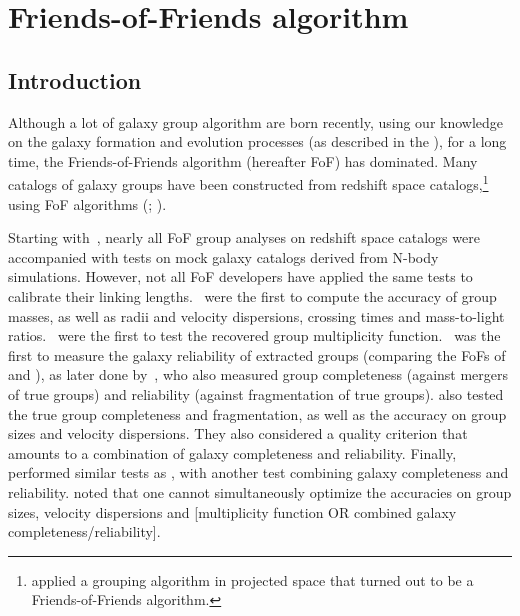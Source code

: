 \def\bpar{$b_\parallel$}
\def\bperp{$b_\bot$}

\chapter{Friends-of-Friends algorithm}
\label{cha:friends_of_friends_algorithm}
\minitoc%

\section{Introduction}
\label{sec:fof_introduction}

Although a lot of galaxy group algorithm are born recently, using our knowledge
on the galaxy formation and evolution processes (as described in the
), for a long time, the
Friends-of-Friends algorithm (hereafter FoF) has dominated. Many catalogs of
galaxy groups have been constructed from redshift space
catalogs,\footnote{\cite{TG76} applied a grouping algorithm in projected space
that turned out to be a Friends-of-Friends algorithm.} using FoF algorithms
(\citealp*{HG82,NW87,RGH89,TrasartiBattistoni98,MZ02};
\citealp{Eke+04,Berlind+06,Tago+10,Robotham+11,Tempel+14}).

Starting with~\cite{NW87},  nearly all FoF group analyses on redshift space
catalogs were accompanied with tests on mock galaxy catalogs derived from
N-body simulations. However, not all FoF developers have applied the same tests
to calibrate their linking lengths.~\cite{NW87} were the first to compute the
accuracy of group masses, as well as radii and velocity dispersions, crossing
times and mass-to-light ratios.~\cite{RGH89} were the first to test the
recovered group multiplicity function.~\cite{Frederic95a} was the first to
measure the galaxy reliability of extracted groups (comparing the FoFs of
\citealp{HG82} and \citealp{NW87}), as later done by~\cite{MZ02}, who also
measured group completeness (against mergers of true groups) and reliability
(against fragmentation of true groups). \citet{Eke+04} also tested the true
group completeness and fragmentation, as well as the accuracy on group sizes
and velocity dispersions. They also considered a quality criterion that amounts
to a combination of galaxy completeness and reliability. Finally,
\citet{Berlind+06} performed similar tests as \citeauthor{Eke+04}, with another
test combining galaxy completeness and reliability. \citeauthor{Berlind+06}
noted that one cannot simultaneously optimize the accuracies on group sizes,
velocity dispersions and [multiplicity function OR combined galaxy
completeness/reliability].

